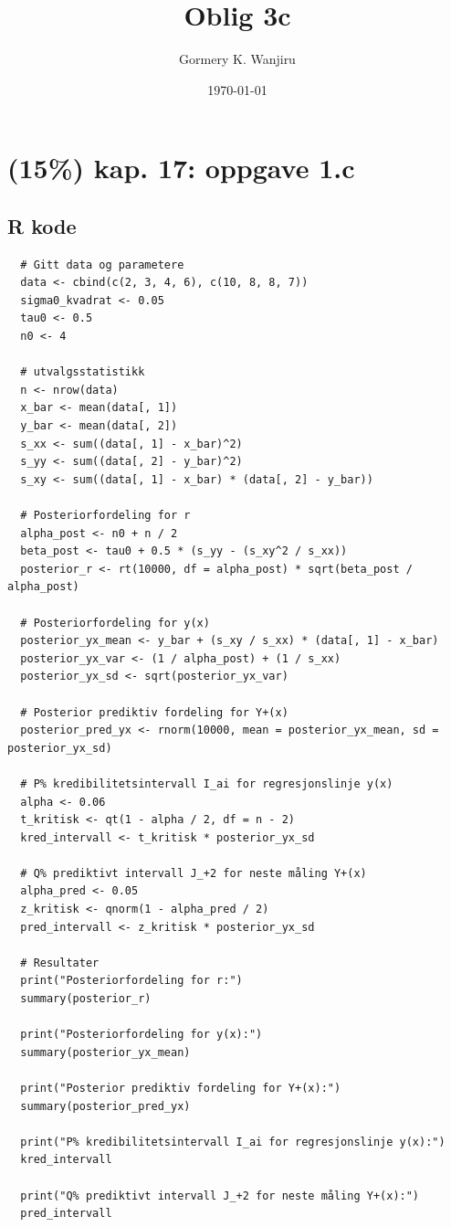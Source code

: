 \documentclass[12pt]{article}
\title{Oblig 3c}
\author{Gormery K. Wanjiru}
\date{\today}
\begin{document}
\maketitle

\newpage
\tableofcontents

\newpage

\section{(15\%) kap. 17: oppgave 1.c}
\subsection{R kode}
\begin{verbatim}
  # Gitt data og parametere
  data <- cbind(c(2, 3, 4, 6), c(10, 8, 8, 7))
  sigma0_kvadrat <- 0.05
  tau0 <- 0.5
  n0 <- 4
  
  # utvalgsstatistikk
  n <- nrow(data)
  x_bar <- mean(data[, 1])
  y_bar <- mean(data[, 2])
  s_xx <- sum((data[, 1] - x_bar)^2)
  s_yy <- sum((data[, 2] - y_bar)^2)
  s_xy <- sum((data[, 1] - x_bar) * (data[, 2] - y_bar))
  
  # Posteriorfordeling for r
  alpha_post <- n0 + n / 2
  beta_post <- tau0 + 0.5 * (s_yy - (s_xy^2 / s_xx))
  posterior_r <- rt(10000, df = alpha_post) * sqrt(beta_post / alpha_post)
  
  # Posteriorfordeling for y(x)
  posterior_yx_mean <- y_bar + (s_xy / s_xx) * (data[, 1] - x_bar)
  posterior_yx_var <- (1 / alpha_post) + (1 / s_xx)
  posterior_yx_sd <- sqrt(posterior_yx_var)
  
  # Posterior prediktiv fordeling for Y+(x)
  posterior_pred_yx <- rnorm(10000, mean = posterior_yx_mean, sd = posterior_yx_sd)
  
  # P% kredibilitetsintervall I_ai for regresjonslinje y(x)
  alpha <- 0.06
  t_kritisk <- qt(1 - alpha / 2, df = n - 2)
  kred_intervall <- t_kritisk * posterior_yx_sd
  
  # Q% prediktivt intervall J_+2 for neste måling Y+(x)
  alpha_pred <- 0.05
  z_kritisk <- qnorm(1 - alpha_pred / 2)
  pred_intervall <- z_kritisk * posterior_yx_sd
  
  # Resultater
  print("Posteriorfordeling for r:")
  summary(posterior_r)
  
  print("Posteriorfordeling for y(x):")
  summary(posterior_yx_mean)
  
  print("Posterior prediktiv fordeling for Y+(x):")
  summary(posterior_pred_yx)
  
  print("P% kredibilitetsintervall I_ai for regresjonslinje y(x):")
  kred_intervall
  
  print("Q% prediktivt intervall J_+2 for neste måling Y+(x):")
  pred_intervall
  
    \end{verbatim}
\end{document}
